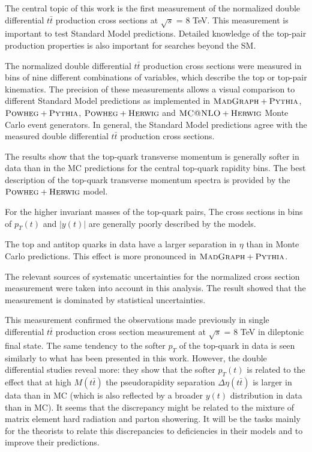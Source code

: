 The central topic of this work is the first measurement of the normalized double differential $t\bar{t}$ production cross 
sections at $\sqrt{s}$ = 8 TeV. This measurement is important to test Standard Model predictions. Detailed knowledge of the 
top-pair production properties is also important for searches beyond the SM.

The normalized double differential $t\bar{t}$ production cross sections were measured in bins of nine different combinations of
variables, which describe the top or top-pair kinematics. The precision of these measurements allows a visual comparison to different 
Standard Model predictions as implemented in $\textsc{MadGraph}+\textsc{Pythia}$, $\textsc{Powheg}+\textsc{Pythia}$, $\textsc{Powheg}+\textsc{Herwig}$ and $\textsc{MC@NLO}+\textsc{Herwig}$ Monte Carlo
event generators. In general, the Standard Model predictions agree with the measured double differential
$t\bar{t}$ production cross sections.

The results show that the top-quark transverse momentum is generally softer in data than in the MC predictions for the central
top-quark rapidity bins. The best description of the top-quark transverse momentum spectra is provided by the $\textsc{Powheg}+\textsc{Herwig}$
model.

For the higher invariant masses of the top-quark pairs, The cross sections in bins of $p_{T}(t)$ and $|y(t)|$ are generally poorly 
described by the models.

The top and antitop quarks in data have a larger separation in $\eta$ than in Monte Carlo predictions. This effect is more pronounced in 
$\textsc{MadGraph}+\textsc{Pythia}$. 

The relevant sources of systematic uncertainties for the normalized cross section measurement were taken into account in this analysis.
The result showed that the measurement is dominated by statistical uncertainties.

This measurement confirmed the observations made previously in single differential $t\bar{t}$ production cross section measurement
at $\sqrt{s}$ = 8 TeV\cite{Asin2014Auth} in dileptonic final state. The same tendency to the softer $p_{T}$ of the top-quark in 
data is seen similarly to what has been presented in this work. However, the double differential studies reveal more: they show that
the softer $p_{T}(t)$ is related to the effect that at high $M(t\bar{t})$ the pseudorapidity separation $\Delta\eta(t\bar{t})$ is larger 
in data than in MC (which is also reflected by a broader $y(t)$ distribution in data than in MC). It seems that the discrepancy might
be related to the mixture of matrix element hard radiation and parton showering. It will be the tasks mainly for the 
theorists to relate this discrepancies to deficiencies in their models and to improve their predictions.

